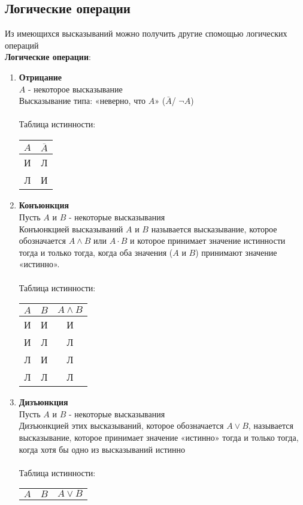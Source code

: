 \documentclass[a4paper, 12pt]{report}
\begin{document}
\subsection*{Логические операции}
Из имеющихся высказываний можно получить другие спомощью логических операций\\
\textbf{Логические операции}:
\begin{enumerate}
	\item \textbf{Отрицание}\\
	$A$ - некоторое высказывание\\
	Высказывание типа: «неверно, что $A$» ($\bar A$/ $\neg A$)\\\\
	Таблица истинности:~~
	\begin{tabular}{|c|c|}
		\hline
		$A$  & $\overline{A}$ \\
		\hline
		И & Л\\
		Л & И\\
		\hline
	\end{tabular}
	\item \textbf{Конъюнкция}\\
	Пусть $A$ и $B$ - некоторые высказывания\\
	Конъюнкцией высказываний $A$ и $B$ называется высказывание, которое обозначается $A \wedge B$ или $A \cdot B$ и которое принимает значение истинности тогда и только тогда, когда оба значения ($A$ и $B$) принимают значение «истинно».\\\\
	Таблица истинности:~~
	\begin{tabular}{|c|c|c|}
		\hline
		$A$  & $B$ & $A \wedge B$ \\
		\hline
		И & И & И\\
		И & Л & Л\\
		Л & И & Л\\
		Л & Л & Л\\
		\hline
	\end{tabular}
	\item \textbf{Дизъюнкция}\\
	Пусть $A$ и $B$ - некоторые высказывания\\
	Дизъюнкцией этих высказываний, которое обозначается $A \vee B$, называется высказывание, которое принимает значение «истинно» тогда и только тогда, когда хотя бы одно из высказываний истинно\\\\
	Таблица истинности:~~ 
	\begin{tabular}{|c|c|c|}
		\hline
		$A$  & $B$ & $A \vee B$ \\

\end{tabular}
\end{enumerate}
\end{document}
